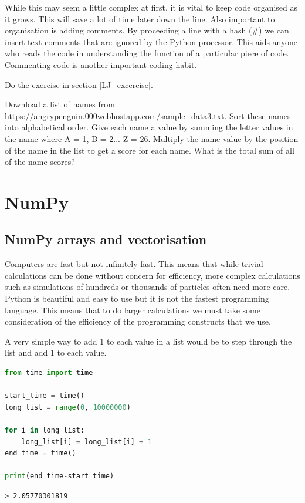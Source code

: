 While this may seem a little complex at first, it is vital to keep code organised as it grows. This will save a lot of time later down the line. Also important to organisation is adding comments. By proceeding a line with a hash (\#) we can insert text comments that are ignored by the Python processor. This aids anyone who reads the code in understanding the function of a particular piece of code. Commenting code is another important coding habit.
\begin{task}Do the exercise in section \ref{LJ_excercise}.\end{task}
\begin{advancedtask} Download a list of names from \url{https://angrypenguin.000webhostapp.com/sample_data3.txt}. Sort these names into alphabetical order. Give each name a value by summing the letter values in the name where A = 1, B = 2... Z = 26. Multiply the name value by the position of the name in the list to get a score for each name. What is the total sum of all of the name scores?\end{advancedtask}

\section{NumPy}
	\subsection{NumPy arrays and vectorisation}
	Computers are fast but not infinitely fast. This means that while trivial calculations can be done without concern for efficiency, more complex calculations such as simulations of hundreds or thousands of particles often need more care. Python is beautiful and easy to use but it is not the fastest programming language. This means that to do larger calculations we must take some consideration of the efficiency of the programming constructs that we use.

	A very simple way to add 1 to each value in a list would be to step through the list and add 1 to each value.
	\begin{lstlisting}[language=Python]
from time import time

start_time = time()
long_list = range(0, 10000000)

for i in long_list:
	long_list[i] = long_list[i] + 1
end_time = time()

print(end_time-start_time)\end{lstlisting}
	\begin{verbatim}> 2.05770301819\end{verbatim}

